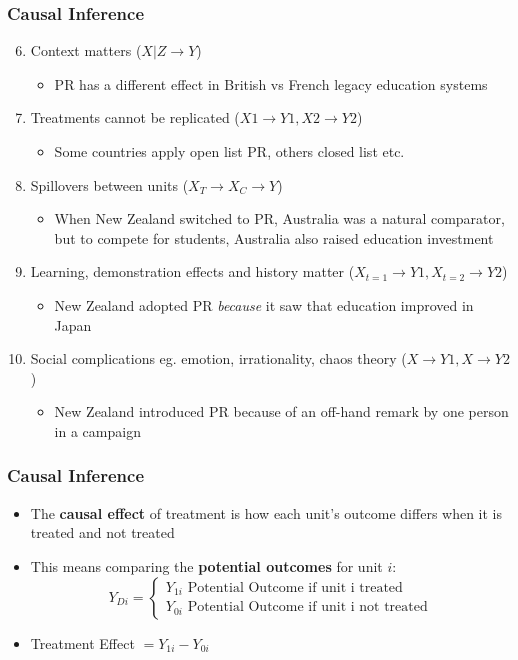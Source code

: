 \documentclass[xcolor=x11names,compress]{beamer}\usepackage[]{graphicx}\usepackage[]{color}
\renewcommand{\(}{\begin{columns}}
\renewcommand{\)}{\end{columns}}
\newcommand{\<}[1]{\begin{column}{#1}}
\renewcommand{\>}{\end{column}}
\begin{document}
\begin{frame}
\frametitle{Causal Inference}
\begin{enumerate}
\setcounter{enumi}{5}
\item Context matters ($X|Z \rightarrow Y$)
\begin{itemize}
\item PR has a different effect in British vs French legacy education systems
\end{itemize}
\item Treatments cannot be replicated ($X1 \rightarrow Y1, X2 \rightarrow Y2$)
\begin{itemize}
\item Some countries apply open list PR, others closed list etc.
\end{itemize}
\item Spillovers between units ($X_T \rightarrow  X_C \rightarrow Y$)
\begin{itemize}
\item When New Zealand switched to PR, Australia was a natural comparator, but to compete for students, Australia also raised education investment
\end{itemize}
\item Learning, demonstration effects and history matter ($X_{t=1} \rightarrow Y1, X_{t=2} \rightarrow Y2$)
\begin{itemize}
\item New Zealand adopted PR \textit{because} it saw that education improved in Japan
\end{itemize}
\item Social complications eg. emotion, irrationality, chaos theory ($X \rightarrow Y1, X \rightarrow Y2$)
\begin{itemize}
\item New Zealand introduced PR because of an off-hand remark by one person in a campaign 
\end{itemize}
\end{enumerate}
\end{frame}

\begin{frame}
\frametitle{Causal Inference}
\begin{itemize}
\item The \textbf{causal effect} of treatment is how each unit's outcome differs when it is treated and not treated
\pause
\item This means comparing the \textbf{potential outcomes} for unit $i$:
\[
Y_{Di} = 
\begin{cases}
Y_{1i}\text{   Potential Outcome if unit i treated} \\
Y_{0i}\text{   Potential Outcome if unit i not treated}
\end{cases}
\]
\item Treatment Effect $ = Y_{1i} - Y_{0i}$
\end{itemize}
\end{frame}
\end{document}
